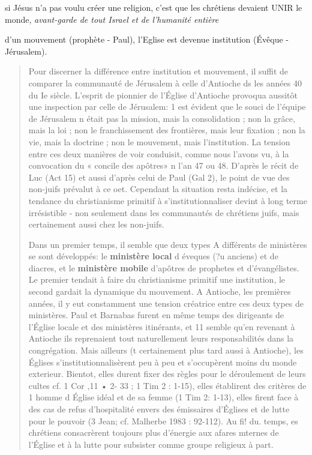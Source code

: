 \begin{Synthesis}
si Jésus n'a pas voulu créer une religion, c'est que les chrétiens devaient UNIR le monde, \textit{avant-garde de tout Israel et de l'humanité entière}

d'un mouvement (prophète - Paul), l'Eglise est devenue institution (Évêque - Jérusalem). 
\end{Synthesis}
\begin{quote} 
    Pour discerner la différence entre institution et mouvement, il suffit de comparer la communauté de Jérusalem à celle d'Antioche ds les
années 40 du I{e} siècle. L'esprit de pionnier de l'Église d'Antioche
provoqua aussitôt une inspection par celle de Jérusalem: 1 est évident
que le souci de l'équipe de Jérusalem n était pas la mission, mais la
consolidation ; non la grâce, mais la loi ; non le franchissement des
frontières, mais leur fixation ; non la vie, mais la doctrine ; non le
mouvement, mais l'institution.
La tension entre ces deux manières de voir conduisit, comme nous
l'avons vu, à la convocation du « concile des apôtres» n l'an 47 ou
48. D'après le récit de Luc (Act 15) et aussi d'après celui de Paul (Gal
2), le point de vue des non-juifs prévalut à ce oet. Cependant la
situation resta indécise, et la tendance du christianisme  primitif à
s'institutionnaliser devint à long terme irrésistible - non seulement
dans les communautés de chrétiens juifs, mais certainement aussi chez
les non-juifs.

Dans un premier temps, il semble que deux types A différents de
ministères se sont développés: le\textbf{ ministère local} d éveques (?u anciens)
et de diacres, et le \textbf{ministère mobile } d'apôtres de prophetes et
d'évangélistes. Le premier tendait à faire du  christianisme  primitif une
institution, le second gardait la dynamique du mouvement. A Antioche,
les premières années, il y eut constamment une tension créatrice
entre ces deux types de ministères. Paul et Barnabas furent en même
temps des dirigeants de l'Église locale et des ministères itinérants, et 11
semble qu'en revenant à Antioche ils reprenaient tout naturellement
leurs responsabilités dans la congrégation. Mais ailleurs (t certainement
plus tard aussi à Antioche), les Églises s'institutionnalisèrent peu
à peu et s'occupèrent moins du monde exterieur. Bientot, elles durent
fixer des règles pour le déroulement de leurs cultes cf. 1 Cor ,11 • 2-
33 ; 1 Tim 2 : 1-15), elles établirent des critères de 1 homme d Église
idéal et de sa femme (1 Tim 2: 1-13), elles firent face à des cas de
refus d'hospitalité envers des émissaires d'Églises et de lutte pour le
pouvoir (3 Jean; cf. Malherbe 1983 : 92-112). Au fi! du. temps, es
chrétiens consacrèrent toujours plus d'énergie aux afares mternes de
l'Église et à la lutte pour subsister comme groupe religieux à part.



\end{quote}
